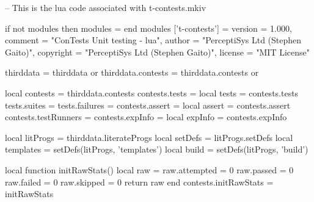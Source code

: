 
\startchapter[title=Preamble]


\startMkIVCode

%
%
\stopMkIVCode

\startMkIVCode
{}

\unprotect

\stopMkIVCode


\startLuaCode
-- This is the lua code associated with t-contests.mkiv

if not modules then modules = { } end modules ['t-contests'] = {
    version   = 1.000,
    comment   = "ConTests Unit testing - lua",
    author    = "PerceptiSys Ltd (Stephen Gaito)",
    copyright = "PerceptiSys Ltd (Stephen Gaito)",
    license   = "MIT License"
}

thirddata            = thirddata          or {}
thirddata.contests   = thirddata.contests or {}

local contests       = thirddata.contests
contests.tests       = {}
local tests          = contests.tests
tests.suites         = {}
tests.failures       = {}
contests.assert      = {}
local assert         = contests.assert
contests.testRunners = {}
contests.expInfo     = {}
local expInfo        = contests.expInfo

local litProgs       = thirddata.literateProgs
local setDefs        = litProgs.setDefs
local templates      = setDefs(litProgs, 'templates')
local build          = setDefs(litProgs, 'build')

local function initRawStats()
  local raw = {}
  raw.attempted  = 0
  raw.passed     = 0
  raw.failed     = 0
  raw.skipped    = 0
  return raw
end
contests.initRawStats = initRawStats

